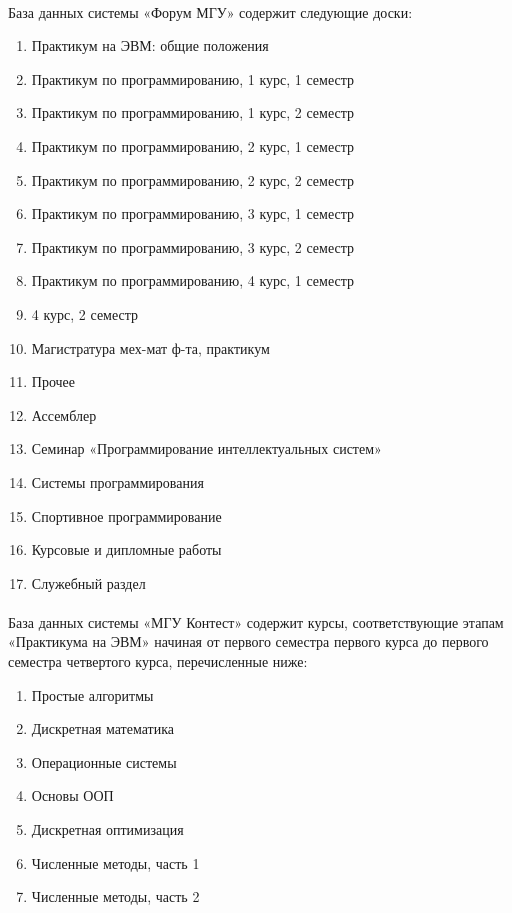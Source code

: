 \documentclass[12pt, a4paper, oneside]{article}
\begin{document}
\paragraph{}
База данных системы «Форум МГУ» содержит следующие доски:
\begin{enumerate}
    \item Практикум на ЭВМ: общие положения
    \item Практикум по программированию, 1 курс, 1 семестр
    \item Практикум по программированию, 1 курс, 2 семестр
    \item Практикум по программированию, 2 курс, 1 семестр
    \item Практикум по программированию, 2 курс, 2 семестр
    \item Практикум по программированию, 3 курс, 1 семестр
    \item Практикум по программированию, 3 курс, 2 семестр
    \item Практикум по программированию, 4 курс, 1 семестр
    \item 4 курс, 2 семестр
    \item Магистратура мех-мат ф-та, практикум
    \item Прочее
    \item Ассемблер
    \item Семинар «Программирование интеллектуальных систем»
    \item Системы программирования
    \item Спортивное программирование
    \item Курсовые и дипломные работы
    \item Служебный раздел
\end{enumerate}
\paragraph{}
База данных системы «МГУ Контест» содержит курсы, соответствующие этапам «Практикума на ЭВМ» начиная от первого семестра первого курса до первого семестра четвертого курса, перечисленные ниже:
\begin{enumerate}
    \item Простые алгоритмы
    \item Дискретная математика
    \item Операционные системы
    \item Основы ООП
    \item Дискретная оптимизация
    \item Численные методы, часть 1
    \item Численные методы, часть 2
\end{enumerate}
\end{document}
